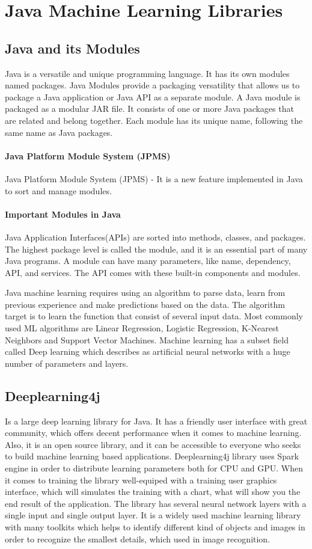 \documentclass[english,12pt,oneside,a4paper]{article}
\begin{document}
		\section{Java Machine Learning Libraries}
		\subsection{Java and its Modules}
		Java is a versatile and unique programming language. It has its own modules named packages. Java Modules provide a packaging versatility that allows us to package a Java application or Java API as a separate module. A Java module is packaged as a modular JAR file. It consists of one or more Java packages that are related and belong together. Each module has its unique name, following the same name as Java packages.
		\paragraph{Java Platform Module System (JPMS)} Java Platform Module System (JPMS) - It is a new feature implemented in Java to sort and manage modules.
		\paragraph{Important Modules in Java} Java Application Interfaces(APIs) are sorted into methods, classes, and packages. The highest package level is called the module, and it is an essential part of many Java programs. A module can have many parameters, like name, dependency, API, and services. The API comes with these built-in components and modules.
		
		
		Java machine learning requires using an algorithm to parse data, learn from previous experience and make predictions based on the data. The algorithm target is to learn the function that consist of several input data. Most commonly used ML algorithms are Linear Regression, Logistic Regression, K-Nearest Neighbors and Support Vector Machines. Machine learning has a subset field called Deep learning which describes as artificial neural networks with a huge number of parameters and layers.
		\subsection{Deeplearning4j}
		Is a large deep learning library for Java. It has a friendly user interface with great community, which offers decent performance when it comes to machine learning. Also, it is an open source library, and it can be accessible to everyone who seeks to build machine learning based applications. Deeplearning4j library uses Spark engine in order to distribute learning parameters both for CPU and GPU. When it comes to training the library well-equiped with a training user graphics interface, which will simulates the training with a chart, what will show you the end result of the application. The library has several neural network layers with a single input and single output layer. It is a widely used machine learning library with many toolkits which helps to identify different kind of objects and images in order to recognize the smallest details, which used in image recognition.
\end{document}

